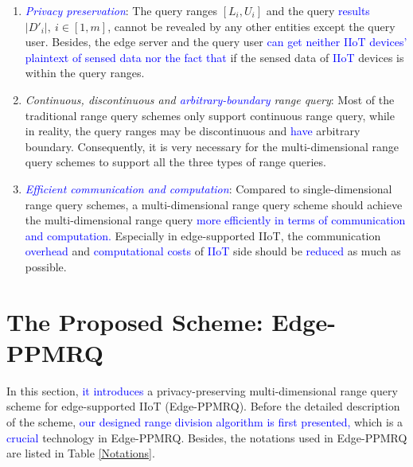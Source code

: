 \documentclass[IEEE JOURNAL OF BIOMEDICAL AND HEALTH INFORMATICS]{IEEEtran}
\begin{document}
{\begin{enumerate}
	\item\emph{\textcolor{blue}{Privacy preservation}}: The query ranges $[L_i, U_i]$ and the query \textcolor{blue}{results} $|D'_i|,\ i \in [1, m]$,  cannot be revealed by any other entities except the query user. Besides, the edge server and the query user \textcolor{blue}{can get neither IIoT devices' plaintext of sensed data nor the fact that} if the sensed data of \textcolor{blue}{IIoT} devices is within the query ranges.	
	\item \emph{Continuous, discontinuous and \textcolor{blue}{arbitrary-boundary} range query}:
	Most of the traditional range query schemes only support continuous range query, while in reality, the query ranges may be discontinuous and \textcolor{blue}{have} arbitrary boundary. Consequently, it is very necessary for the multi-dimensional range query schemes to support all the three types of range queries.
	
	\item \emph{\textcolor{blue}{Efficient communication and computation}}: Compared to single-dimensional range query schemes, a multi-dimensional range query scheme should achieve the multi-dimensional range query \textcolor{blue}{more efficiently in terms of communication and computation.} Especially in edge-supported IIoT, the communication \textcolor{blue}{overhead} and \textcolor{blue}{computational costs} of \textcolor{blue}{IIoT} side should be \textcolor{blue}{reduced} as much as possible.
\end{enumerate}

\section{The Proposed Scheme: Edge-PPMRQ}
In this section, \textcolor{blue}{it introduces} a privacy-preserving multi-dimensional range query scheme for edge-supported IIoT (Edge-PPMRQ). Before the detailed description of the scheme, \textcolor{blue}{our designed range division algorithm is first presented,} which is a \textcolor{blue}{crucial} technology in Edge-PPMRQ. Besides, the notations used in Edge-PPMRQ are listed in Table \ref{Notations}.

}
\end{document}
